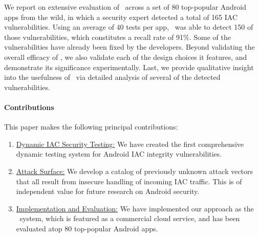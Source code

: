 We report on extensive evaluation of \Tool\ across a set of 80 top-popular Android apps from the wild, in which a security expert detected a total of 165 IAC vulnerabilities. 
Using an average of 40 tests per app, \Tool\ was able to detect 150 of those vulnerabilities, which constitutes a recall rate of 91\%. Some of the vulnerabilities have already been fixed by the developers. Beyond validating the overall efficacy of \Tool, we also validate each of the design choices it features, and demonstrate its significance experimentally. Last, we provide qualitative insight into the usefulness of \Tool\ via detailed analysis of several of the detected vulnerabilities.

\paragraph{Contributions} This paper makes the following principal contributions:
\begin{enumerate}
	\item \underline{Dynamic IAC Security Testing:} We have created the first comprehensive dynamic testing system for Android IAC integrity vulnerabilities.
	\item \underline{Attack Surface:} We develop a catalog of previously unknown attack vectors that all result from insecure handling of incoming IAC traffic. This is of independent value for future research on Android security. 
	\item \underline{Implementation and Evaluation:} We have implemented our approach as the \Tool\ system, which is featured as a commercial cloud service, and has been evaluated atop 80 top-popular Android apps.
\end{enumerate}


 